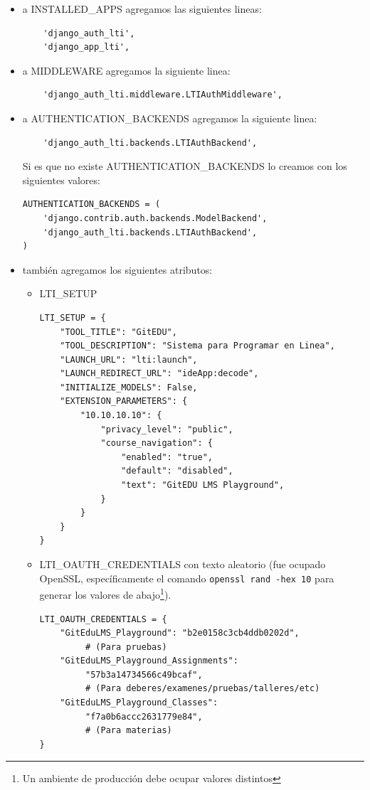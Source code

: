 \begin{itemize}
	\item a INSTALLED\_APPS agregamos las siguientes lineas:
   		\begin{lstlisting}
    'django_auth_lti',
    'django_app_lti',
    	\end{lstlisting}
    \item a MIDDLEWARE agregamos la siguiente linea:
   		\begin{lstlisting}
    'django_auth_lti.middleware.LTIAuthMiddleware',
    	\end{lstlisting}
    \item a AUTHENTICATION\_BACKENDS agregamos la siguiente linea:
   		\begin{lstlisting}
    'django_auth_lti.backends.LTIAuthBackend',
    	\end{lstlisting}
        Si es que no existe AUTHENTICATION\_BACKENDS lo creamos con los siguientes valores:
        \begin{lstlisting}
AUTHENTICATION_BACKENDS = (
    'django.contrib.auth.backends.ModelBackend',
    'django_auth_lti.backends.LTIAuthBackend',
)
        \end{lstlisting}
    \item también agregamos los siguientes atributos:
    	\begin{itemize}
    		\item LTI\_SETUP
            	\begin{lstlisting}
LTI_SETUP = {
    "TOOL_TITLE": "GitEDU",
    "TOOL_DESCRIPTION": "Sistema para Programar en Linea",
    "LAUNCH_URL": "lti:launch",
    "LAUNCH_REDIRECT_URL": "ideApp:decode",
    "INITIALIZE_MODELS": False,
    "EXTENSION_PARAMETERS": {
        "10.10.10.10": {
            "privacy_level": "public",
            "course_navigation": {
                "enabled": "true",
                "default": "disabled",
                "text": "GitEDU LMS Playground",
            }
        }
    }
}
            	\end{lstlisting}
            \item LTI\_OAUTH\_CREDENTIALS con texto aleatorio (fue ocupado OpenSSL, específicamente el comando \texttt{openssl rand -hex 10} para generar los valores de abajo\footnote{Un ambiente de producción debe ocupar valores distintos}).
            	\begin{lstlisting}
LTI_OAUTH_CREDENTIALS = {
    "GitEduLMS_Playground": "b2e0158c3cb4ddb0202d", 
         # (Para pruebas)
    "GitEduLMS_Playground_Assignments":
         "57b3a14734566c49bcaf",
         # (Para deberes/examenes/pruebas/talleres/etc)
    "GitEduLMS_Playground_Classes":
         "f7a0b6accc2631779e84",
         # (Para materias)
}
            	\end{lstlisting}
    	\end{itemize}
\end{itemize}

